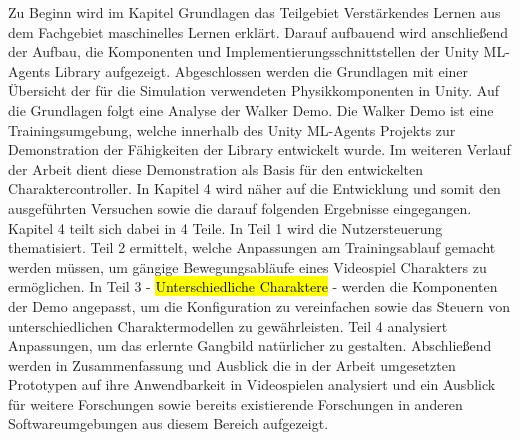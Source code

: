Zu Beginn wird im Kapitel Grundlagen das Teilgebiet Verstärkendes Lernen aus dem Fachgebiet maschinelles Lernen erklärt. Darauf aufbauend wird anschließend der Aufbau, die Komponenten und Implementierungsschnittstellen der Unity ML-Agents Library aufgezeigt. Abgeschlossen werden die Grundlagen mit einer Übersicht der für die Simulation verwendeten Physikkomponenten in Unity. Auf die Grundlagen folgt eine Analyse der Walker Demo. Die Walker Demo ist eine Trainingsumgebung, welche innerhalb des Unity ML-Agents Projekts zur Demonstration der Fähigkeiten der Library entwickelt wurde. Im weiteren Verlauf der Arbeit dient diese Demonstration als Basis für den entwickelten Charaktercontroller. In Kapitel 4 wird näher auf die Entwicklung und somit den ausgeführten Versuchen sowie die darauf folgenden Ergebnisse eingegangen. Kapitel 4 teilt sich dabei in 4 Teile. In Teil 1 wird die Nutzersteuerung thematisiert. Teil 2 ermittelt, welche Anpassungen am Trainingsablauf gemacht werden müssen, um gängige Bewegungsabläufe eines Videospiel Charakters zu ermöglichen. In Teil 3 - \hl{Unterschiedliche Charaktere} - werden die Komponenten der Demo angepasst, um die Konfiguration zu vereinfachen sowie das Steuern von unterschiedlichen Charaktermodellen zu gewährleisten. Teil 4 analysiert Anpassungen, um das erlernte Gangbild natürlicher zu gestalten. Abschließend werden in Zusammenfassung und Ausblick die in der Arbeit umgesetzten Prototypen auf ihre Anwendbarkeit in Videospielen analysiert und ein Ausblick für weitere Forschungen sowie bereits existierende Forschungen in anderen Softwareumgebungen aus diesem Bereich aufgezeigt.